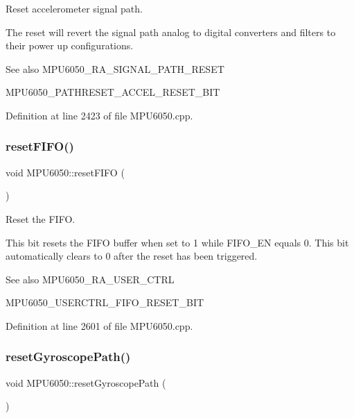 Reset accelerometer signal path. 

The reset will revert the signal path analog to digital converters and filters to their power up configurations. \begin{DoxySeeAlso}{See also}
M\+P\+U6050\+\_\+\+R\+A\+\_\+\+S\+I\+G\+N\+A\+L\+\_\+\+P\+A\+T\+H\+\_\+\+R\+E\+S\+ET 

M\+P\+U6050\+\_\+\+P\+A\+T\+H\+R\+E\+S\+E\+T\+\_\+\+A\+C\+C\+E\+L\+\_\+\+R\+E\+S\+E\+T\+\_\+\+B\+IT 
\end{DoxySeeAlso}


Definition at line 2423 of file M\+P\+U6050.\+cpp.

\mbox{\label{classMPU6050_aafa0dc38b7ea2acd1aecd5d9df8cbd08}} 
\subsubsection{\texorpdfstring{resetFIFO()}{resetFIFO()}}
{\footnotesize\ttfamily void M\+P\+U6050\+::reset\+F\+I\+FO (\begin{DoxyParamCaption}{ }\end{DoxyParamCaption})}



Reset the F\+I\+FO. 

This bit resets the F\+I\+FO buffer when set to 1 while F\+I\+F\+O\+\_\+\+EN equals 0. This bit automatically clears to 0 after the reset has been triggered. \begin{DoxySeeAlso}{See also}
M\+P\+U6050\+\_\+\+R\+A\+\_\+\+U\+S\+E\+R\+\_\+\+C\+T\+RL 

M\+P\+U6050\+\_\+\+U\+S\+E\+R\+C\+T\+R\+L\+\_\+\+F\+I\+F\+O\+\_\+\+R\+E\+S\+E\+T\+\_\+\+B\+IT 
\end{DoxySeeAlso}


Definition at line 2601 of file M\+P\+U6050.\+cpp.

\mbox{\label{classMPU6050_af1599c0d70f07fd3e28683d571842c22}} 
\subsubsection{\texorpdfstring{resetGyroscopePath()}{resetGyroscopePath()}}
{\footnotesize\ttfamily void M\+P\+U6050\+::reset\+Gyroscope\+Path (\begin{DoxyParamCaption}{ }\end{DoxyParamCaption})}



